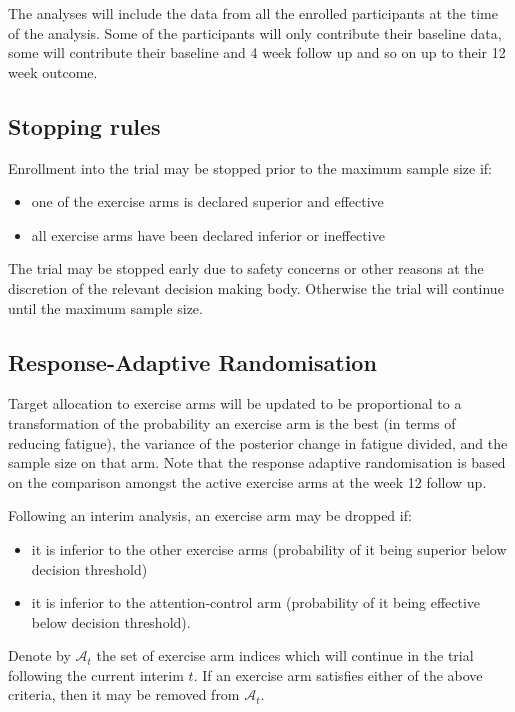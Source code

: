 \documentclass[11pt,parskip=half-]{scrartcl}
\providecommand{\tightlist}{%
  \setlength{\itemsep}{0pt}\setlength{\parskip}{0pt}}
\begin{document}
The analyses will include the data from all the enrolled participants at the time of the analysis. Some of the participants will only contribute their baseline data, some will contribute their baseline and 4 week follow up and so on up to their 12 week outcome.

\subsection{Stopping rules}\label{stopping-rules}

Enrollment into the trial may be stopped prior to the maximum sample size if:

\begin{itemize}\tightlist
  \item one of the exercise arms is declared superior and effective
  \item all exercise arms have been declared inferior or ineffective
\end{itemize}

The trial may be stopped early due to safety concerns or other reasons at the discretion of the relevant decision making body. Otherwise the trial will continue until the maximum sample size.

\subsection{Response-Adaptive Randomisation}\label{sec:response-adaptive-randomisation}

Target allocation to exercise arms will be updated to be proportional to a transformation of the probability an exercise arm is the best (in terms of reducing fatigue), the variance of the posterior change in fatigue divided, and the sample size on that arm. Note that the response adaptive randomisation is based on the comparison amongst the active exercise arms at the week 12 follow up.

Following an interim analysis, an exercise arm may be dropped if:
\begin{itemize}\tightlist
  \item it is inferior to the other exercise arms (probability of it being superior below decision threshold)
  \item it is inferior to the attention-control arm (probability of it being effective below decision threshold).
\end{itemize}

Denote by $\mathcal{A}_t$ the set of exercise arm indices which will continue in the trial following the current interim $t$. If an exercise arm satisfies either of the above criteria, then it may be removed from $\mathcal{A}_t$.
\end{document}
